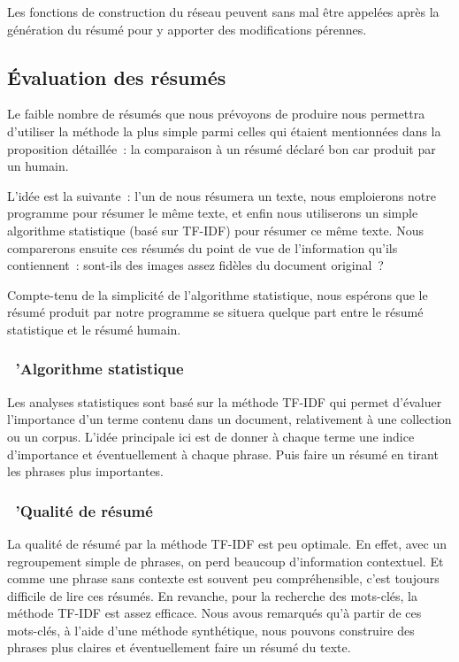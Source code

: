 \documentclass[a4paper, 12pt]{article}
\begin{document}
Les fonctions de construction du réseau peuvent sans mal être appelées après la génération du résumé pour y apporter des modifications pérennes.

\subsection{\'Evaluation des résumés}
Le faible nombre de résumés que nous prévoyons de produire nous permettra d'utiliser la méthode la plus simple parmi celles qui étaient mentionnées dans la proposition détaillée~: la comparaison à un résumé déclaré bon car produit par un humain.

L'idée est la suivante~: l'un de nous résumera un texte, nous emploierons notre programme pour résumer le même texte, et enfin nous utiliserons un simple algorithme statistique (basé sur TF-IDF) pour résumer ce même texte. Nous comparerons ensuite ces résumés du point de vue de l'information qu'ils contiennent~: sont-ils des images assez fidèles du document original~?

Compte-tenu de la simplicité de l'algorithme statistique, nous espérons que le résumé produit par notre programme se situera quelque part entre le résumé statistique et le résumé humain.


\subsubsection{\ 'Algorithme statistique}
Les analyses statistiques sont basé sur la méthode TF-IDF qui permet d'évaluer l'importance d'un terme contenu dans un document, relativement à une collection ou un corpus. L'idée principale ici est de donner à chaque terme une indice d'importance et éventuellement à chaque phrase. Puis faire un résumé en tirant les phrases plus importantes.


\subsubsection{\ 'Qualité de résumé}
La qualité de résumé par la méthode TF-IDF est peu optimale. En effet, avec un regroupement simple de phrases, on perd beaucoup d'information contextuel. Et comme une phrase sans contexte est souvent peu compréhensible, c'est toujours difficile de lire ces résumés.
En revanche, pour la recherche des mots-clés, la méthode TF-IDF est assez efficace. Nous avous remarqués qu'à partir de ces mots-clés, à l'aide d'une méthode synthétique, nous pouvons construire des phrases plus claires et éventuellement faire un résumé du texte.
 
\end{document}
